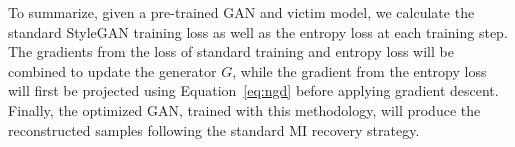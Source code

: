 To summarize, given a pre-trained GAN and victim model, we calculate the standard StyleGAN training loss as well as the entropy loss at each training step.
The gradients from the loss of standard training and entropy loss will be combined to update the generator $G$, while the gradient from the entropy loss will first be projected using Equation~\ref{eq:ngd} before applying gradient descent.
Finally, the optimized GAN, trained with this methodology, will produce the reconstructed samples following the standard MI recovery strategy.